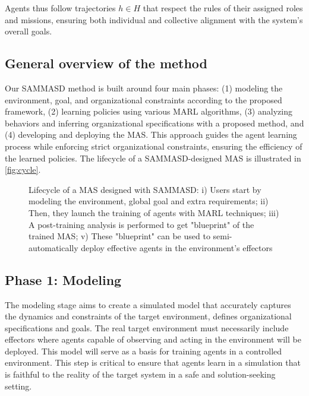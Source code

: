 \documentclass[sigconf,anonymous]{aamas}
\begin{document}
\noindent Agents thus follow trajectories $h \in H$ that respect the rules of their assigned roles and missions, ensuring both individual and collective alignment with the system's overall goals.


\subsection{General overview of the method}

Our SAMMASD method is built around four main phases: (1) modeling the environment, goal, and organizational constraints according to the proposed framework, (2) learning policies using various MARL algorithms, (3) analyzing behaviors and inferring organizational specifications with a proposed method, and (4) developing and deploying the MAS. This approach guides the agent learning process while enforcing strict organizational constraints, ensuring the efficiency of the learned policies. The lifecycle of a SAMMASD-designed MAS is illustrated in \autoref{fig:cycle}.



\begin{figure}[h!]
  \centering
  
  \caption{Lifecycle of a MAS designed with SAMMASD: i) Users start by modeling the environment, global goal and extra requirements; \quad ii) Then, they launch the training of agents with MARL techniques; \quad iii) A post-training analysis is performed to get "blueprint" of the trained MAS; \quad v) These "blueprint" can be used to semi-automatically deploy effective agents in the environment's effectors}
  \label{fig:cycle}
\end{figure}



\subsection{Phase 1: Modeling}

The modeling stage aims to create a simulated model that accurately captures the dynamics and constraints of the target environment, defines organizational specifications and goals. The real target environment must necessarily include effectors where agents capable of observing and acting in the environment will be deployed. This model will serve as a basis for training agents in a controlled environment. This step is critical to ensure that agents learn in a simulation that is faithful to the reality of the target system in a safe and solution-seeking setting.
\end{document}
